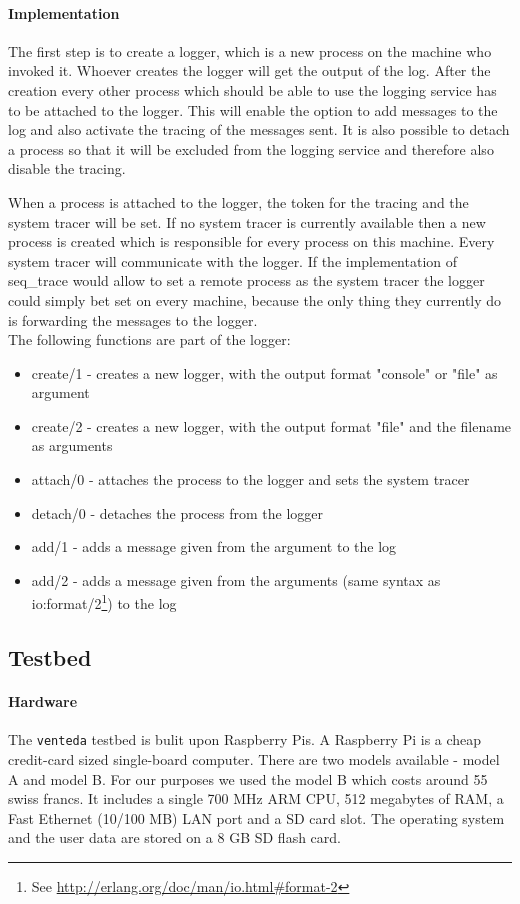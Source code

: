 \documentclass[10pt,a4wide]{article}
\begin{document}
\paragraph{Implementation}
The first step is to create a logger, which is a new process on the machine who invoked it. Whoever creates the logger will get the output of the log.
After the creation every other process which should be able to use the logging service has to be attached to the logger. This will enable the option to add messages to the log and also activate the tracing of the messages sent.
It is also possible to detach a process so that it will be excluded from the logging service and therefore also disable the tracing.

When a process is attached to the logger, the token for the tracing and the system tracer will be set. If no system tracer is currently available then a new process is created which is responsible for every process on this machine.
Every system tracer will communicate with the logger. If the implementation of seq\_trace would allow to set a remote process as the system tracer the logger could simply bet set on every machine, because the only thing they currently do is forwarding the messages to the logger.\\

The following functions are part of the logger:
\begin{itemize}
\itemsep0em
\item create/1  -  creates a new logger, with the output format "console" or "file" as argument
\item create/2  -  creates a new logger, with the output format "file" and the filename as arguments
\item attach/0  -  attaches the process to the logger and sets the system tracer
\item detach/0	-  detaches the process from the logger
\item add/1		-  adds a message given from the argument to the log
\item add/2		-  adds a message given from the arguments (same syntax as io:format/2\footnote{See \url{http://erlang.org/doc/man/io.html\#format-2}}) to the log
\end{itemize}

\subsection{Testbed}
\paragraph{Hardware}
The \texttt{venteda} testbed is bulit upon Raspberry Pis. A Raspberry Pi is a cheap credit-card sized single-board computer. There are two models available - model A and model B. For our purposes we used the model B which costs around 55 swiss francs. It includes a single 700 MHz ARM CPU, 512 megabytes of RAM, a Fast Ethernet (10/100 MB) LAN port and a SD card slot. The operating system and the user data are stored on a 8 GB SD flash card. 
\end{document}
